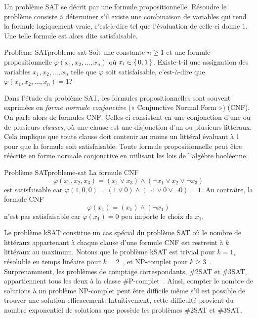 Un problème SAT se décrit par une formule propositionnelle. Résoudre le problème consiste à déterminer s'il existe une combinaison de variables qui rend la formule logiquement vraie, c'est-à-dire tel que l'évaluation de celle-ci donne 1. Une telle formule est alors dite satisfaisable.

\begin{maindefinition}{Problème SAT}{probleme-sat}
    Soit une constante $n \geq 1$ et une formule propositionnelle $\varphi(x_{1}, x_{2}, \dots, x_{n})$ où $x_{i} \in \set{ 0, 1 }$.  Existe-t-il une assignation des variables $x_{1}, x_{2}, \dots, x_{n}$ telle que $\varphi$ soit satisfaisable, c'est-à-dire que $\varphi(x_{1}, x_{2}, \dots, x_{n})=1$?
\end{maindefinition}

Dans l'étude du problème SAT, les formules propositionnelles sont souvent exprimées en \textit{forme normale conjonctive} (« Conjunctive Normal Form ») (CNF). On parle alors de formules CNF. Celles-ci consistent en une conjonction d'une ou de plusieurs \textit{clauses}, où une clause est une disjonction d'un ou plusieurs littéraux. Cela implique que toute clause doit contenir au moins un littéral évaluant à 1 pour que la formule soit satisfaisable. Toute formule propositionnelle peut être réécrite en forme normale conjonctive en utilisant les lois de l'algèbre booléenne.

\begin{example}{Problème SAT}{probleme-sat}
    La formule CNF
    \begin{equation*}
        \varphi(x_{1}, x_{2}, x_{3}) = (x_{1} \lor x_{3}) \land (\neg x_{1} \lor x_{2} \lor \neg x_{3})
    \end{equation*}
    est satisfaisable car $\varphi(1,0,0) = (1 \lor 0) \land (\neg 1 \lor 0 \lor \neg 0) = 1$. Au contraire, la formule CNF
    \begin{equation*}
        \varphi(x_{1})= (x_{1}) \land (\neg x_{1})
    \end{equation*}
    n'est pas satisfaisable car $\varphi (x_{1}) = 0$ peu importe le choix de $x_{1}$.
\end{example}

Le problème kSAT constitue un cas spécial du problème SAT où le nombre de littéraux appartenant à chaque clause d'une formule CNF est restreint à $k$ littéraux au maximum. Notons que le problème kSAT est trivial pour $k=1$, résoluble en temps linéaire pour $k=2$~\cite{kromDecisionProblemClass1967}, et \textsf{NP}-complet pour $k \geq 3$~\cite{karpReducibilityCombinatorialProblems1972}. Surprenamment, les problèmes de comptage correspondants, \#2SAT et \#3SAT, appartiennent tous les deux à la classe \textsf{\#P}-complet~\cite{valiantComplexityEnumerationReliability1979}. Ainsi, compter le nombre de solutions à un problème \textsf{NP}-complet peut être difficile même s'il est possible de trouver une solution efficacement. Intuitivement, cette difficulté provient du nombre exponentiel de solutions que possède les problèmes \#2SAT et \#3SAT.

